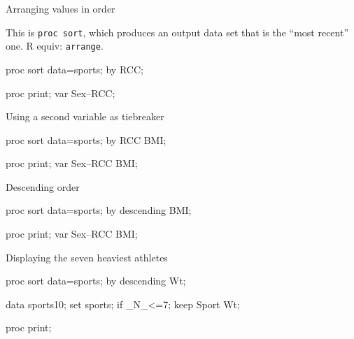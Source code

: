 \documentclass[unknownkeysallowed]{beamer}\usepackage[]{graphicx}\usepackage[]{color}
\begin{document}
\begin{frame}[fragile]{Arranging values in order}
  
  This is \texttt{proc sort}, which produces an output data set that
  is the ``most recent'' one. R equiv: \texttt{arrange}.
  
  \begin{Sascode}[store=tj]
proc sort data=sports;
  by RCC;
  
proc print;  
  var Sex--RCC;
  \end{Sascode}
  
  
\end{frame}

\begin{frame}[fragile]{Using a second variable as tiebreaker}
  
  
  \begin{Sascode}[store=tk]
proc sort data=sports;
  by RCC BMI;
  
proc print;  
  var Sex--RCC BMI;
  \end{Sascode}
  
  
\end{frame}

\begin{frame}[fragile]{Descending order}
  
  
  \begin{Sascode}[store=tl]
proc sort data=sports;
  by descending BMI;
  
proc print;  
  var Sex--RCC BMI;
  \end{Sascode}
  
  
\end{frame}

\begin{frame}[fragile]{Displaying the seven heaviest athletes}
  
  \begin{Sascode}[store=tm]
proc sort data=sports;
  by descending Wt;
  
data sports10;
  set sports;
  if _N_<=7;
  keep Sport Wt;
  
proc print;
  \end{Sascode}
  
  
\end{frame}
\end{document}
